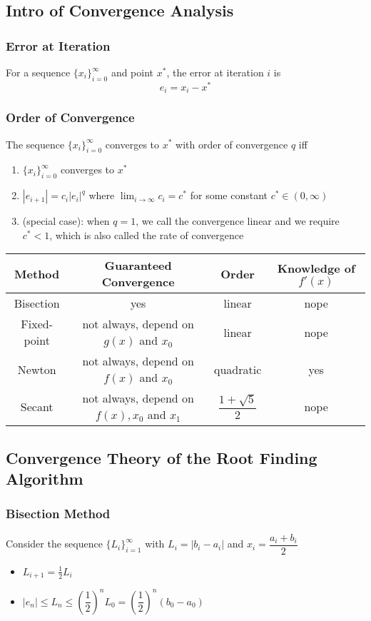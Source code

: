 \documentclass[11pt]{article}
\newcommand{\ds}{\displaystyle}
\begin{document}
\subsection{Intro of Convergence Analysis}
\subsubsection{Error at Iteration} 
For a sequence $\{x_i\}_{i=0}^\infty$ and point $x^*$, the error at iteration $i$ is \[e_i = x_i - x^*\]
\subsubsection{Order of Convergence}
The sequence $\{x_i\}_{i=0}^\infty$ converges to $x^*$ with order of convergence $q$ iff
\begin{enumerate}
  \item $\{x_i\}_{i=0}^\infty$ converges to $x^*$
  \item $|e_{i+1}| = c_i|e_i|^q$ where $\ds\lim_{i\rightarrow\infty}c_i = c^*$ for some constant $c^*\in(0,\infty)$
  \item (special case): when $q=1$, we call the convergence linear and we require $c^*<1$, which is also called the rate of convergence  
\end{enumerate}
\begin{center}
  \begin{tabular}{ c|c|c|c }
    Method &Guaranteed Convergence &Order &Knowledge of $f'(x)$ \\ \hline 
    Bisection &yes &linear &nope \\ \hline 
    Fixed-point &not always, depend on $g(x)$ and $x_0$ &linear &nope \\ \hline 
    Newton &not always, depend on $f(x)$ and $x_0$ &quadratic &yes \\ \hline 
    Secant &not always, depend on $f(x), x_0$ and $x_1$ &$\dfrac{1+\sqrt{5}}{2}$ &nope 
  \end{tabular}
\end{center}
\subsection{Convergence Theory of the Root Finding Algorithm}
\subsubsection{Bisection Method}
Consider the sequence $\{L_i\}_{i=1}^\infty$ with $L_i=|b_i-a_i|$ and $x_i = \dfrac{a_i+b_i}{2}$
\begin{itemize}
  \item $L_{i+1} = \frac{1}{2}L_i$ 
  \item $|e_n|\leq L_n\leq (\dfrac{1}{2})^n L_0 = (\dfrac{1}{2})^n(b_0-a_0)$
\end{itemize}
\end{document}
